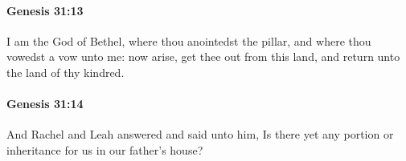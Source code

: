 		\paragraph{Genesis 31:13} %
			\label{GENESIS-31-13}

			I am the God of Bethel, where thou anointedst the pillar, and where thou vowedst a vow unto me: now arise, get thee out from this land, and return unto the land of thy kindred.


		\paragraph{Genesis 31:14} %
			\label{GENESIS-31-14}

			And Rachel and Leah answered and said unto him, Is there yet any portion or inheritance for us in our father's house?


